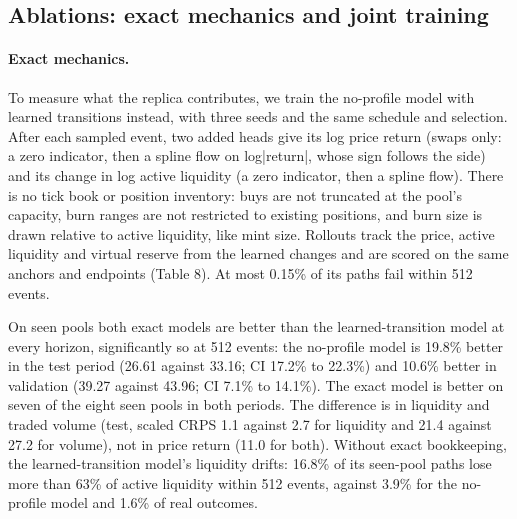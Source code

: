 \documentclass[11pt]{article}
\begin{document}
\subsection{Ablations: exact mechanics and joint training}

\paragraph{Exact mechanics.} To measure what the replica contributes, we train the no-profile model with learned transitions instead, with three seeds and the same schedule and selection. After each sampled event, two added heads give its log price return (swaps only: a zero indicator, then a spline flow on log|return|, whose sign follows the side) and its change in log active liquidity (a zero indicator, then a spline flow). There is no tick book or position inventory: buys are not truncated at the pool's capacity, burn ranges are not restricted to existing positions, and burn size is drawn relative to active liquidity, like mint size. Rollouts track the price, active liquidity and virtual reserve from the learned changes and are scored on the same anchors and endpoints (Table 8). At most 0.15\% of its paths fail within 512 events.

On seen pools both exact models are better than the learned-transition model at every horizon, significantly so at 512 events: the no-profile model is 19.8\% better in the test period (26.61 against 33.16; CI 17.2\% to 22.3\%) and 10.6\% better in validation (39.27 against 43.96; CI 7.1\% to 14.1\%). The exact model is better on seven of the eight seen pools in both periods. The difference is in liquidity and traded volume (test, scaled CRPS 1.1 against 2.7 for liquidity and 21.4 against 27.2 for volume), not in price return (11.0 for both). Without exact bookkeeping, the learned-transition model's liquidity drifts: 16.8\% of its seen-pool paths lose more than 63\% of active liquidity within 512 events, against 3.9\% for the no-profile model and 1.6\% of real outcomes.
\end{document}
